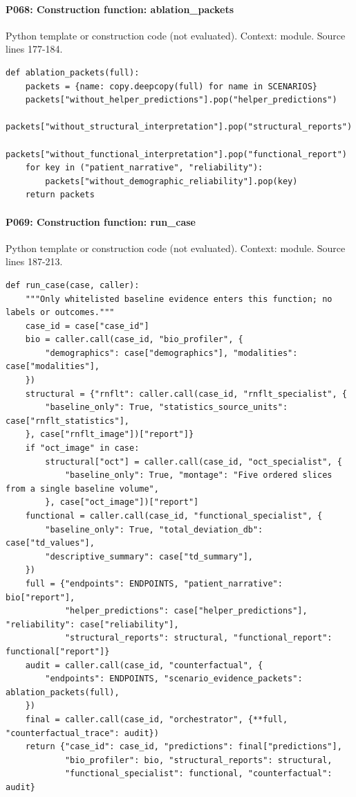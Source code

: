 \documentclass[10pt]{article}
\begin{document}
\paragraph{P068: Construction function: ablation\_packets}
Python template or construction code (not evaluated). Context: module. Source lines 177-184.
\begin{Verbatim}
def ablation_packets(full):
    packets = {name: copy.deepcopy(full) for name in SCENARIOS}
    packets["without_helper_predictions"].pop("helper_predictions")
    packets["without_structural_interpretation"].pop("structural_reports")
    packets["without_functional_interpretation"].pop("functional_report")
    for key in ("patient_narrative", "reliability"):
        packets["without_demographic_reliability"].pop(key)
    return packets
\end{Verbatim}
\paragraph{P069: Construction function: run\_case}
Python template or construction code (not evaluated). Context: module. Source lines 187-213.
\begin{Verbatim}
def run_case(case, caller):
    """Only whitelisted baseline evidence enters this function; no labels or outcomes."""
    case_id = case["case_id"]
    bio = caller.call(case_id, "bio_profiler", {
        "demographics": case["demographics"], "modalities": case["modalities"],
    })
    structural = {"rnflt": caller.call(case_id, "rnflt_specialist", {
        "baseline_only": True, "statistics_source_units": case["rnflt_statistics"],
    }, case["rnflt_image"])["report"]}
    if "oct_image" in case:
        structural["oct"] = caller.call(case_id, "oct_specialist", {
            "baseline_only": True, "montage": "Five ordered slices from a single baseline volume",
        }, case["oct_image"])["report"]
    functional = caller.call(case_id, "functional_specialist", {
        "baseline_only": True, "total_deviation_db": case["td_values"],
        "descriptive_summary": case["td_summary"],
    })
    full = {"endpoints": ENDPOINTS, "patient_narrative": bio["report"],
            "helper_predictions": case["helper_predictions"], "reliability": case["reliability"],
            "structural_reports": structural, "functional_report": functional["report"]}
    audit = caller.call(case_id, "counterfactual", {
        "endpoints": ENDPOINTS, "scenario_evidence_packets": ablation_packets(full),
    })
    final = caller.call(case_id, "orchestrator", {**full, "counterfactual_trace": audit})
    return {"case_id": case_id, "predictions": final["predictions"],
            "bio_profiler": bio, "structural_reports": structural,
            "functional_specialist": functional, "counterfactual": audit}
\end{Verbatim}
\clearpage
\end{document}
